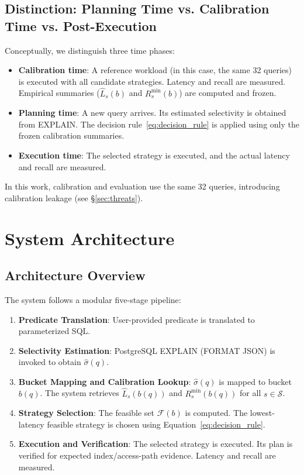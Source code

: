 \documentclass[10pt,twocolumn]{article}
\begin{document}
\subsection{Distinction: Planning Time vs. Calibration Time vs. Post-Execution}

Conceptually, we distinguish three time phases:

\begin{itemize}
\item \textbf{Calibration time}: A reference workload (in this case, the same 32 queries) is executed with all candidate strategies. Latency and recall are measured. Empirical summaries ($\widehat{L}_s(b)$ and $R^{\min}_s(b)$) are computed and frozen.
\item \textbf{Planning time}: A new query arrives. Its estimated selectivity is obtained from EXPLAIN. The decision rule~\eqref{eq:decision_rule} is applied using only the frozen calibration summaries.
\item \textbf{Execution time}: The selected strategy is executed, and the actual latency and recall are measured.
\end{itemize}

In this work, calibration and evaluation use the same 32 queries, introducing calibration leakage (see \S\ref{sec:threats}).

\section{System Architecture}
\label{sec:architecture}

\subsection{Architecture Overview}

The system follows a modular five-stage pipeline:

\begin{enumerate}
\item \textbf{Predicate Translation}: User-provided predicate is translated to parameterized SQL.
\item \textbf{Selectivity Estimation}: PostgreSQL EXPLAIN (FORMAT JSON) is invoked to obtain $\hat{\sigma}(q)$.
\item \textbf{Bucket Mapping and Calibration Lookup}: $\hat{\sigma}(q)$ is mapped to bucket $b(q)$. The system retrieves $\widehat{L}_s(b(q))$ and $R^{\min}_s(b(q))$ for all $s \in \mathcal{S}$.
\item \textbf{Strategy Selection}: The feasible set $\mathcal{F}(b)$ is computed. The lowest-latency feasible strategy is chosen using Equation~\eqref{eq:decision_rule}.
\item \textbf{Execution and Verification}: The selected strategy is executed. Its plan is verified for expected index/access-path evidence. Latency and recall are measured.
\end{enumerate}
\end{document}
